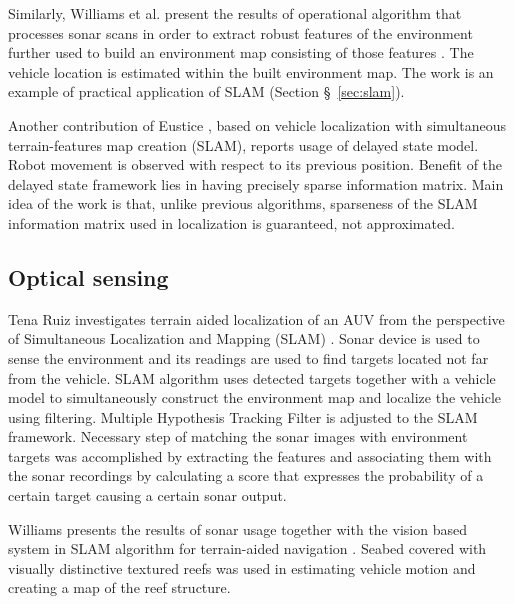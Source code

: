 Similarly, Williams et al. present the results of operational algorithm that processes sonar scans in order to extract robust features of the environment further used to build an environment map consisting of those features \cite{williams00}. The vehicle location is estimated within the built environment map. The work is an example of practical application of SLAM (Section \S~\ref{sec:slam}).

Another contribution of Eustice \cite{eustice05exactly}, based on vehicle localization with simultaneous terrain-features map creation (SLAM), reports usage of delayed state model. Robot movement is observed with respect to its previous position. Benefit of the delayed state framework lies in having precisely sparse information matrix. Main idea of the work is that, unlike previous algorithms, sparseness of the SLAM information matrix used in localization is guaranteed, not approximated.
\subsection{Optical sensing}
Tena Ruiz investigates terrain aided localization of an AUV from the perspective of Simultaneous Localization and Mapping (SLAM) \cite{ruiz01}. Sonar device is used to sense the environment and its readings are used to find targets located not far from the vehicle. SLAM algorithm uses detected targets together with a vehicle model to simultaneously construct the environment map and localize the vehicle using filtering. Multiple Hypothesis Tracking Filter is adjusted to the SLAM framework. Necessary step of matching the sonar images with environment targets was accomplished by extracting the features and associating them with the sonar recordings by calculating a score that expresses the probability of a certain target causing a certain sonar output. 

Williams presents the results of sonar usage together with the vision based system in SLAM algorithm for terrain-aided navigation \cite{williams04}. Seabed covered with visually distinctive textured reefs was used in estimating vehicle motion and creating a map of the reef structure.  

